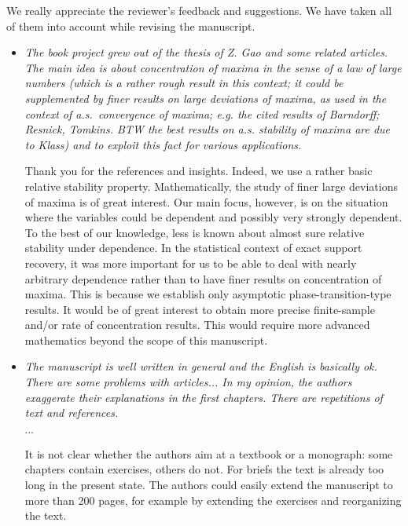 \documentclass[11pt]{article}
\begin{document}
  We really appreciate the reviewer's feedback and suggestions.   We have taken all of them into account while revising the manuscript. 
  
   \begin{itemize}
   
     \item {\em The book project grew out of the thesis of Z. Gao and some related articles. The main idea is about concentration of maxima in the sense of a law of large numbers (which is a rather rough result in this context; it could be supplemented by finer results on large deviations of maxima, as used in the context of a.s.\ convergence of maxima; e.g. the cited results of Barndorff; Resnick, Tomkins. BTW the best results on a.s. stability of maxima are due to Klass) and to exploit this fact for various applications.
}
     
     Thank you for the references and insights.  
     Indeed, we use a rather basic relative stability property.  Mathematically, the study of finer large deviations of maxima is of great interest.  Our 
     main focus, however, is on the situation where the variables could be dependent and possibly very strongly dependent.  To the best of our knowledge, 
     less is known about almost sure relative stability under dependence.  In the statistical context of exact support recovery, it was more important for us 
     to be able to deal with nearly arbitrary dependence rather than to have finer results on concentration of maxima.  This is because we establish only
     asymptotic phase-transition-type results.  It would be of great interest to obtain more precise finite-sample 
     and/or rate of concentration results. This would require more advanced mathematics beyond the scope of this manuscript.
     
     \item {\em The manuscript is well written in general and the English is basically ok. There are some problems with articles... In my opinion, the authors exaggerate their explanations in the first chapters. There are repetitions of text and references.
     
     \centerline{$\cdots$}
     
     It is not clear whether the authors aim at a textbook or a monograph: some chapters contain exercises, others do not. For briefs the text is already too long in the present state. The authors could easily extend the manuscript to more than 200 pages, for example by extending the exercises and reorganizing the text.}
     

\end{itemize}
\end{document}
